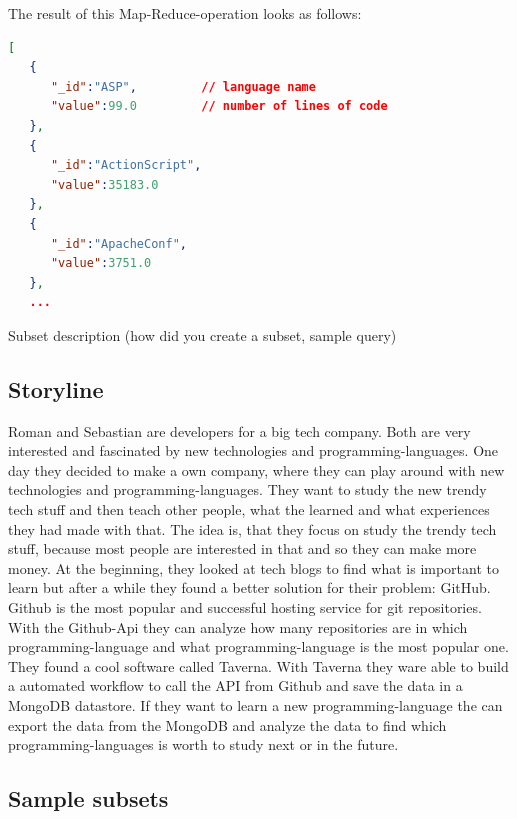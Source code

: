The result of this Map-Reduce-operation looks as follows:

\begin{lstlisting}[language=json]
[  
   {  
      "_id":"ASP",         // language name
      "value":99.0         // number of lines of code
   },
   {  
      "_id":"ActionScript",
      "value":35183.0
   },
   {  
      "_id":"ApacheConf",
      "value":3751.0
   },
   ...
\end{lstlisting}

Subset description (how did you create a subset, sample query)

\subsection{Storyline}\label{sec:storyline}

Roman and Sebastian are developers for a big tech company. Both are very
interested and fascinated by new technologies and programming-languages. One day
they decided to make a own company, where they can play around with new
technologies and programming-languages. They want to study the new trendy tech
stuff and then teach other people, what the learned and what experiences they
had made with that. The idea is, that they focus on study the trendy tech stuff,
because most people are interested in that and so they can make more money.
At the beginning, they looked at tech blogs to find what is important to learn
but after a while they found a better solution for their problem: GitHub.
Github is the most popular and successful hosting service for git repositories.
With the Github-Api they can analyze how many repositories are in which
programming-language and what programming-language is the most popular one.  
They found a cool software called Taverna. With Taverna they ware able to
build a automated workflow to call the API from Github and save the data in a
MongoDB datastore. If they want to learn a new programming-language the can
export the data from the MongoDB and analyze the data to find which
programming-languages is worth to study next or in the future.  

\subsection{Sample subsets}\label{sec:sample-subsets}

